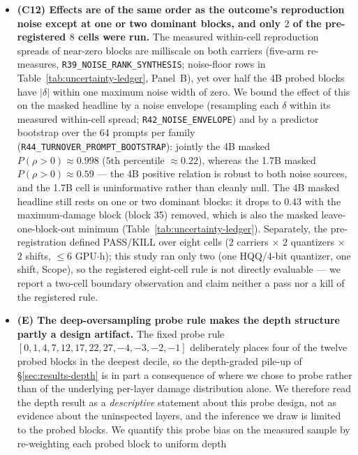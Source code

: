 \documentclass{article}
\newcommand{\bk}{\discretionary{}{}{}}
\begin{document}
\begin{itemize}
  \item \textbf{(C12) Effects are of the same order as the outcome's reproduction noise except at
        one or two dominant blocks, and only $2$ of the pre-registered $8$ cells were run.} The
        measured within-cell reproduction spreads of near-zero blocks are milliscale on both
        carriers (five-arm re-measures, \texttt{R39\bk\_NOISE\bk\_RANK\bk\_SYNTHESIS}; noise-floor
        rows in Table~\ref{tab:uncertainty-ledger}, Panel~B), yet over half the 4B probed blocks
        have $|\delta|$ within one maximum noise width of zero. We bound the effect of this on the
        masked headline by a noise envelope (resampling each $\delta$ within its measured
        within-cell spread; \texttt{R42\bk\_NOISE\bk\_ENVELOPE}) and by a predictor bootstrap over
        the 64 prompts per family (\texttt{R44\bk\_TURNOVER\bk\_PROMPT\bk\_BOOTSTRAP}): jointly the
        4B masked $P(\rho>0)\approx 0.998$ ($5$th percentile $\approx 0.22$), whereas the 1.7B
        masked $P(\rho>0)\approx 0.59$ --- the 4B positive relation is robust to both noise sources,
        and the 1.7B cell is uninformative rather than cleanly null. The 4B masked headline still
        rests on one or two dominant blocks: it drops to $0.43$ with the maximum-damage block
        (block 35) removed, which is also the masked leave-one-block-out minimum
        (Table~\ref{tab:uncertainty-ledger}). Separately, the pre-registration defined PASS/KILL over eight cells
        ($2$ carriers $\times$ $2$ quantizers $\times$ $2$ shifts, $\le 6$ GPU$\cdot$h); this
        study ran only two (one HQQ/4-bit quantizer, one shift, Scope), so the registered
        eight-cell rule is not directly evaluable --- we report a two-cell boundary observation
        and claim neither a pass nor a kill of the registered rule.
  \item \textbf{(E) The deep-oversampling probe rule makes the depth structure partly a design
        artifact.} The fixed probe rule $[0,1,4,7,12,17,22,27,-4,-3,-2,-1]$ deliberately places
        four of the twelve probed blocks in the deepest decile, so the depth-graded pile-up of
        \S\ref{sec:results-depth} is in part a consequence of where we chose to probe rather than
        of the underlying per-layer damage distribution alone. We therefore read the depth result
        as a \emph{descriptive} statement about this probe design, not as evidence about the
        uninspected layers, and the inference we draw is limited to the probed blocks. We quantify
        this probe bias on the measured sample by re-weighting each probed block to uniform depth

\end{itemize}
\end{document}
